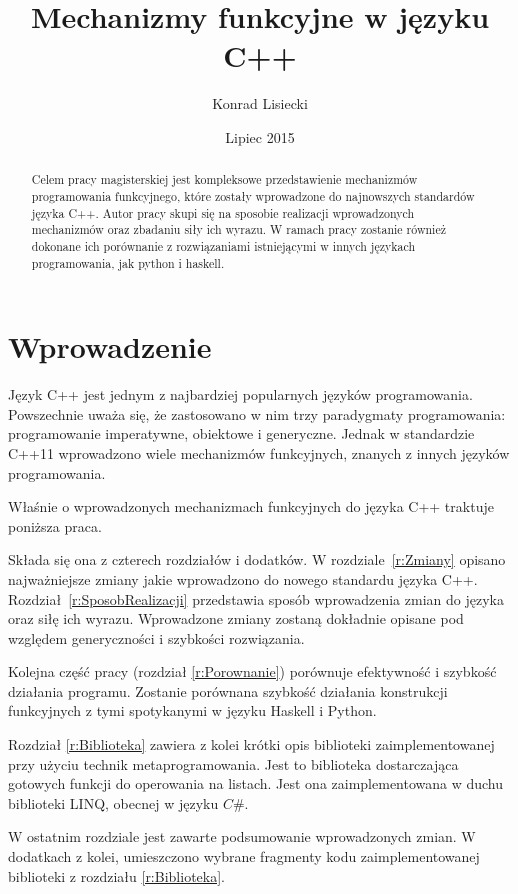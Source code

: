 \documentclass{pracamgr}
\author{Konrad Lisiecki}
\title{Mechanizmy funkcyjne w języku C++}
\date{Lipiec 2015}
\begin{document}
\maketitle

\begin{abstract}
Celem pracy magisterskiej jest kompleksowe przedstawienie mechanizmów programowania 
funkcyjnego, które zostały wprowadzone do najnowszych standardów języka C++. Autor pracy skupi się
na sposobie realizacji wprowadzonych mechanizmów oraz zbadaniu siły ich wyrazu. 
W ramach pracy zostanie również dokonane ich porównanie z rozwiązaniami istniejącymi w innych 
językach programowania, jak python i haskell.
\end{abstract}


\tableofcontents


\chapter*{Wprowadzenie}


Język C++ jest jednym z najbardziej popularnych języków programowania.
Powszechnie uważa się, że zastosowano w nim trzy paradygmaty programowania: programowanie imperatywne, obiektowe i generyczne.
Jednak w standardzie C++11 wprowadzono wiele mechanizmów funkcyjnych, znanych z innych języków programowania.

Właśnie o wprowadzonych mechanizmach funkcyjnych do języka C++ traktuje poniższa praca.

Składa się ona z czterech rozdziałów i dodatków.
W rozdziale~\ref{r:Zmiany} opisano najważniejsze zmiany jakie wprowadzono do nowego standardu języka C++.
Rozdział~\ref{r:SposobRealizacji} przedstawia sposób wprowadzenia zmian do języka oraz siłę ich wyrazu. 
Wprowadzone zmiany zostaną dokładnie opisane pod względem generyczności i szybkości rozwiązania.


Kolejna część pracy (rozdział \ref{r:Porownanie}) porównuje efektywność i szybkość działania programu.
Zostanie porównana szybkość działania konstrukcji funkcyjnych z tymi spotykanymi w języku Haskell i Python.

Rozdział \ref{r:Biblioteka} zawiera z kolei krótki opis biblioteki zaimplementowanej przy użyciu technik 
metaprogramowania. Jest to biblioteka dostarczająca gotowych funkcji do operowania na listach. Jest ona 
zaimplementowana w duchu biblioteki LINQ, obecnej w języku $C\#$. 


W ostatnim rozdziale jest zawarte podsumowanie wprowadzonych zmian. 
W dodatkach z kolei, umieszczono wybrane fragmenty kodu zaimplementowanej biblioteki z rozdziału \ref{r:Biblioteka}.
\end{document}
